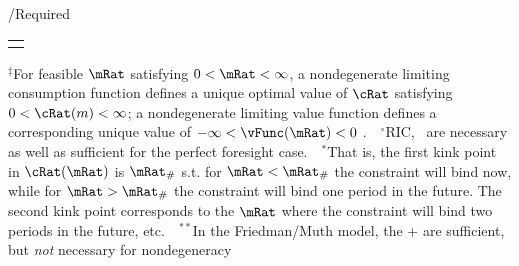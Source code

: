 \documentclass[\econtexRoot/BufferStockTheory]{subfiles}
\begin{document}
\begin{verbatimwrite}{\TableDir/Required}
\begin{table}
{\begin{tabular}{|l|l|l|}
\\ \hline \multicolumn{3}{c}{}
\end{tabular}
} %

\settowidth\TableWidth{\usebox{\Required}}
\newlength{\RequiredShrunk}
\newsavebox{\RequiredShrunkBox}

\savebox{\RequiredShrunkBox}{
  \settowidth{\RequiredShrunk}{\usebox{\Required}}
  \resizebox{\textwidth}{!}{\begin{minipage}{\RequiredShrunk}
      \usebox{\Required}
    \end{minipage}}
}

\usebox{\RequiredShrunkBox}


\parbox{\textwidth}{\footnotesize         $^{\ddagger}$For feasible $\mRat$ satisfying $0 < \mRat < \infty$, a nondegenerate limiting consumption function defines a unique optimal value of $\cRat$ satisfying $0 < \cRat(m) < \infty$; a nondegenerate limiting value function defines a corresponding unique value of $-\infty < \vFunc(\mRat) < 0$ .~~$^{\circ}$RIC, \FHWC~are necessary as well as sufficient for the perfect foresight case.~~$^{\ast}$That is, the first kink point in $\cRat(\mRat)$ is $\mRat_{\#}$ s.t. for $\mRat < \mRat_{\#}$ the constraint will bind now, while for $\mRat > \mRat_{\#}$ the constraint will bind one period in the future.  The second kink point corresponds to the $\mRat$ where the constraint will bind two periods in the future, etc.~~$^{\ast\ast}$In the Friedman/Muth model, the {\RIC}+{\FHWC} are sufficient, but \textit{not} necessary for nondegeneracy} 
\end{table}
    
\end{verbatimwrite}
\clearpage

\end{document}
